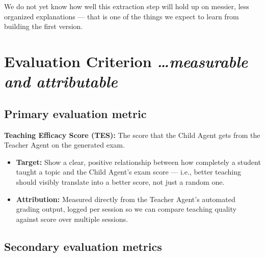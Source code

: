 \documentclass[11pt,a4paper]{article}
\newcommand{\mysection}[2]{%
    \section[#1]{#1 \hfill {\normalfont\itshape #2}}
}
\begin{document}
We do not yet know how well this extraction step will hold up on messier, less organized explanations --- that is one of the things we expect to learn from building the first version.


\mysection{Evaluation Criterion}{\ldots measurable and attributable}

\subsection{Primary evaluation metric}

\textbf{Teaching Efficacy Score (TES):} The score that the Child Agent gets from the Teacher Agent on the generated exam.

\begin{itemize}

    \item \textbf{Target:} Show a clear, positive relationship between how completely a student taught a topic and the Child Agent's exam score --- i.e., better teaching should visibly translate into a better score, not just a random one.

    \item \textbf{Attribution:} Measured directly from the Teacher Agent's automated grading output, logged per session so we can compare teaching quality against score over multiple sessions.

\end{itemize}

\subsection{Secondary evaluation metrics}
\end{document}
